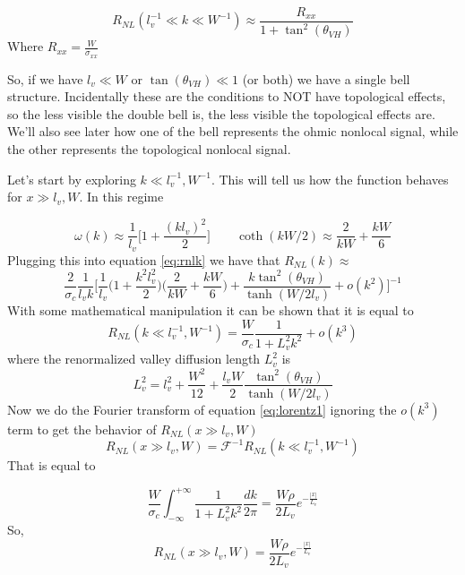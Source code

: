 \begin{equation}
    R_{NL}(l_v^{-1}\ll k \ll W^{-1})\approx \frac{R_{xx}}{1+\tan^2(\theta_{VH})}   
    \label{eq:plateau} 
\end{equation}
Where $R_{xx}=\frac{W}{\sigma_{xx}}$

So, if we have $l_v\ll W$ or $\tan(\theta_{VH})\ll 1$ (or both) we have a single bell structure. Incidentally these are the conditions to NOT have topological effects, so the less visible the double bell is, the less visible the topological effects are. We'll also see later how one of the bell represents the ohmic nonlocal signal, while the other represents the topological nonlocal signal. 


Let's start by exploring $k\ll l_v^{-1},W^{-1}$. This will tell us how the function behaves for $x\gg l_v,W$. In this regime 

\begin{equation}
    \omega(k)\approx \frac 1{l_v}\bigg[1+\frac{(kl_v)^2}2\bigg]\quad\quad
    \coth (kW/2)\approx \frac 2{kW} + \frac{kW}6
\end{equation}
Plugging this into equation \ref{eq:rnlk} we have that $R_{NL}(k)\approx$
\begin{equation}
    \frac 2{\sigma_c}\frac 1 {l_vk}\Bigg[
        \frac 1{l_v}\bigg(1+\frac{k^2l_v^2}{2}\bigg)\bigg(\frac 2{kW} + \frac{kW}6\bigg)+
        \frac{k\tan^2(\theta_{VH})}{\tanh(W/2l_v)} + o(k^2)
    \Bigg]^{-1}
\end{equation}
With some mathematical manipulation it can be shown that it is equal to 
\begin{equation}
    R_{NL}(k\ll l_v^{-1},W^{-1})=
    \frac W{\sigma_c}\frac 1{1+L_v^2k^2} + o(k^3)
    \label{eq:lorentz1}
\end{equation}
where the renormalized valley diffusion length $L_v^2$ is 
\begin{equation}
    L_v^2 = l_v^2+\frac {W^2}{12} +\frac{l_vW}2 \frac{\tan^2(\theta_{VH})}{\tanh(W/2l_v)}
\end{equation}
Now we do the Fourier transform of equation \ref{eq:lorentz1} ignoring the $o(k^3)$ term to get the behavior of $R_{NL}(x\gg l_v,W)$
\begin{equation}
    R_{NL}(x\gg l_v,W)=\mathcal F^{-1}R_{NL}(k\ll l_v^{-1},W^{-1}) 
    \label{eq:rxg}
\end{equation}
That is equal to 

\begin{equation}
    \frac W{\sigma_c}\int_{-\infty}^{+\infty}
    \frac 1{1+L_v^2k^2}
    \frac {dk}{2\pi}=
    \frac{W\rho}{2L_v}e^{-\frac{|x|}{L_v}}
\end{equation}
So,
\begin{equation}
    R_{NL}(x\gg l_v,W)=\frac{W\rho}{2L_v}e^{-\frac{|x|}{L_v}}
    \label{eq:rxl}
\end{equation}


